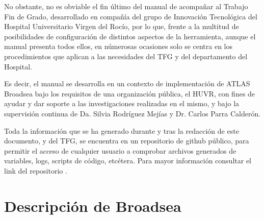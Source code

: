 
No obstante, no es obviable el fin último del manual de acompañar al Trabajo Fin de Grado, desarrollado en compañía del grupo de Innovación Tecnológica del Hospital Universitario Virgen del Rocío, por lo que, frente a la multitud de posibilidades de configuración de distintos aspectos de la herramienta, aunque el manual presenta todos ellos, en númerosas ocasiones solo se centra en los procedimientos que aplican a las necesidades del TFG y del departamento del Hospital.

Es decir, el manual se desarrolla en un contexto de implementación de ATLAS Broadsea bajo los requisitos de una organización pública, el HUVR, con fines de ayudar y dar soporte a las investigaciones realizadas en el mismo, y bajo la supervisión continua de Da. Silvia Rodríguez Mejías y Dr. Carlos Parra Calderón.


Toda la información que se ha generado durante y tras la redacción de este documento, y del TFG, se encuentra en un repositorio de github público, para permitir el acceso de cualquier usuario a comprobar archivos generados de variables, logs, scripts de código, etcétera. Para mayor información consultar el link del repositorio \cite{vallealonsodc}.

\section{Descripción de Broadsea} \label{cap:01descripBroadsea}



